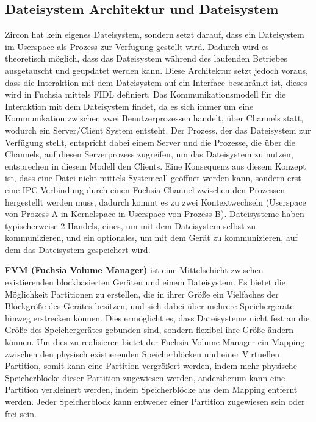 \documentclass[a4paper]{scrartcl}
\begin{document}
\subsection{Dateisystem Architektur und Dateisystem}
Zircon hat kein eigenes Dateisystem, sondern setzt darauf, dass ein Dateisystem im Userspace als Prozess zur Verfügung gestellt wird. Dadurch wird es theoretisch möglich, dass das Dateisystem während des laufenden Betriebes ausgetauscht und geupdatet werden kann. Diese Architektur setzt jedoch voraus, dass die Interaktion mit dem Dateisystem auf ein Interface beschränkt ist, dieses wird in Fuchsia mittels FIDL definiert. \cite{Fuchsia.FIDL.io}\cite{Fuchsia.FIDL.io2} Das Kommunikationsmodell für die Interaktion mit dem Dateisystem findet, da es sich immer um eine Kommunikation zwischen zwei Benutzerprozessen handelt, über Channels statt, wodurch ein Server/Client System entsteht. Der Prozess, der das Dateisystem zur Verfügung stellt, entspricht dabei einem Server und die Prozesse, die über die Channels, auf diesen Serverprozess zugreifen, um das Dateisystem zu nutzen, entsprechen in diesem Modell den Clients. Eine Konsequenz aus diesem Konzept ist, dass eine Datei nicht mittels Systemcall geöffnet werden kann, sondern erst eine IPC Verbindung durch einen Fuchsia Channel \cite{Fuchsia.Kernel.KernelObjects} zwischen den Prozessen hergestellt werden muss, dadurch kommt es zu zwei Kontextwechseln (Userspace von Prozess A in Kernelspace in Userspace von Prozess B). Dateisysteme haben typischerweise 2 Handels, eines, um mit dem Dateisystem selbst zu kommunizieren, und ein optionales, um mit dem Gerät zu kommunizieren, auf dem das Dateisystem gespeichert wird. \cite{Fuchsia.Storage}

\textbf{FVM (Fuchsia Volume Manager)} ist eine Mittelschicht zwischen existierenden blockbasierten Geräten und einem Dateisystem. Es bietet die Möglichkeit Partitionen zu erstellen, die in ihrer Größe ein Vielfaches der Blockgröße des Gerätes besitzen, und sich dabei über mehrere Speichergeräte hinweg erstrecken können. Dies ermöglicht es, dass Dateisysteme nicht fest an die Größe des Speichergerätes gebunden sind, sondern flexibel ihre Größe ändern können. Um dies zu realisieren bietet der Fuchsia Volume Manager ein Mapping zwischen den physisch existierenden Speicherblöcken und einer Virtuellen Partition, somit kann eine Partition vergrößert werden, indem mehr physische Speicherblöcke dieser Partition zugewiesen werden, andersherum kann eine Partition verkleinert werden, indem Speicherblöcke aus dem Mapping entfernt werden. Jeder Speicherblock kann entweder einer Partition zugewiesen sein oder frei sein.\cite{Fuchsia.Storage}
\end{document}
